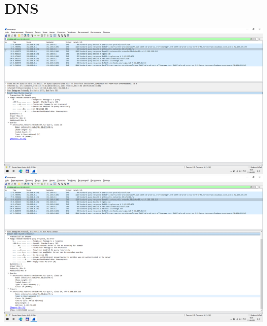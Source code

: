 \section{DNS}
\includegraphics{screenshots/dns_request_1}
\includegraphics{screenshots/dns_response_1}
